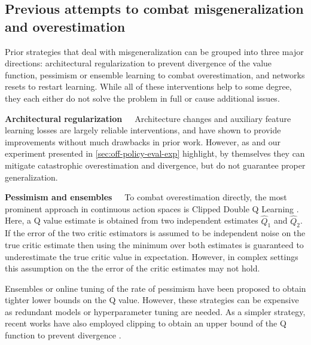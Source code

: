 \subsection{Previous attempts to combat misgeneralization and overestimation}
\label{sec:prior}
Prior strategies that deal with misgeneralization can be grouped into three major directions: architectural regularization to prevent divergence of the value function, pessimism or ensemble learning to combat overestimation, and networks resets to restart learning.
While all of these interventions help to some degree, they each either do not solve the problem in full or cause additional issues.

\textbf{Architectural regularization}~~~Architecture changes \parencite{hussing2024dissecting,nauman2024overestimation,nauman2024bigger,lyle2024disentangling} and auxiliary feature learning losses \parencite{schwarzer2021dataefficient,zhao2023simplified,ni2024bridging,voelcker2024when} are largely reliable interventions, and have shown to provide improvements without much drawbacks in prior work.
However, as \textcite{hussing2024dissecting} and our experiment presented in \autoref{sec:off-policy-eval-exp} highlight, by themselves they can mitigate catastrophic overestimation and divergence, but do not guarantee proper generalization. %

\textbf{Pessimism and ensembles}~~~To combat overestimation directly, the most prominent approach in continuous action spaces is Clipped Double Q Learning \parencite{fujimoto2018addressing}. 
Here, a Q value estimate is obtained from two independent estimates $\hat{Q}_1$ and $\hat{Q}_2$.
If the error of the two critic estimators is assumed to be independent noise on the true critic estimate 
then using the minimum over both estimates is guaranteed to underestimate the true critic value in expectation.
However, in complex settings this assumption on the the error of the critic estimates may not hold. 

Ensembles \parencite{lan2020maxmin,chen2020randomized,hiraoka2022dropout,farebrother2023protovalue} or online tuning of the rate of pessimism \parencite{moskovitz2021tactical} have been proposed to obtain tighter lower bounds on the Q value.
However, these strategies can be expensive as redundant models or hyperparameter tuning are needed.
As a simpler strategy, recent works have also employed clipping to obtain an upper bound of the Q function to prevent divergence \parencite{fujimoto2024sale}.

